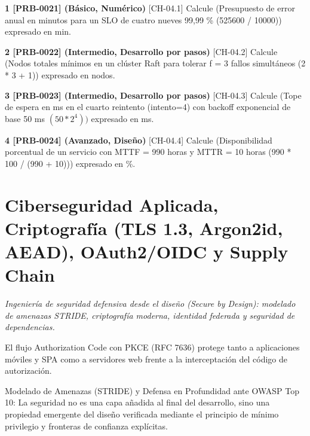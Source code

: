 \documentclass{book}
\begin{document}
\begin{tcolorbox}[title={Ejercicios}, studiumworked, breakable]

\noindent\textbf{1 [PRB-0021] (Básico, Numérico)}
[CH-04.1] Calcule (Presupuesto de error anual en minutos para un SLO de cuatro nueves 99,99 \% (525600 / 10000)) expresado en min.

\noindent\textbf{2 [PRB-0022] (Intermedio, Desarrollo por pasos)}
[CH-04.2] Calcule (Nodos totales mínimos en un clúster Raft para tolerar f = 3 fallos simultáneos (2 * 3 + 1)) expresado en nodos.

\noindent\textbf{3 [PRB-0023] (Intermedio, Desarrollo por pasos)}
[CH-04.3] Calcule (Tope de espera en ms en el cuarto reintento (intento=4) con backoff exponencial de base 50 ms \((50 * 2^4))\) expresado en ms.

\noindent\textbf{4 [PRB-0024] (Avanzado, Diseño)}
[CH-04.4] Calcule (Disponibilidad porcentual de un servicio con MTTF = 990 horas y MTTR = 10 horas (990 * 100 / (990 + 10))) expresado en \%.
\end{tcolorbox}

\chapter{Ciberseguridad Aplicada, Criptografía (TLS 1.3, Argon2id, AEAD), OAuth2/OIDC y Supply Chain}
\label{chap:ch-05}

\noindent\textit{Ingeniería de seguridad defensiva desde el diseño (Secure by Design): modelado de amenazas STRIDE, criptografía moderna, identidad federada y seguridad de dependencias.}

\begin{tcolorbox}[title={Consejo}, studiumtip, breakable]

El flujo Authorization Code con PKCE (RFC 7636) protege tanto a aplicaciones móviles y SPA como a servidores web frente a la interceptación del código de autorización.
\end{tcolorbox}

\begin{tcolorbox}[title={Definición}, studiumdef, breakable]

Modelado de Amenazas (STRIDE) y Defensa en Profundidad ante OWASP Top 10: La seguridad no es una capa añadida al final del desarrollo, sino una propiedad emergente del diseño verificada mediante el principio de mínimo privilegio y fronteras de confianza explícitas.
\end{tcolorbox}
\end{document}

